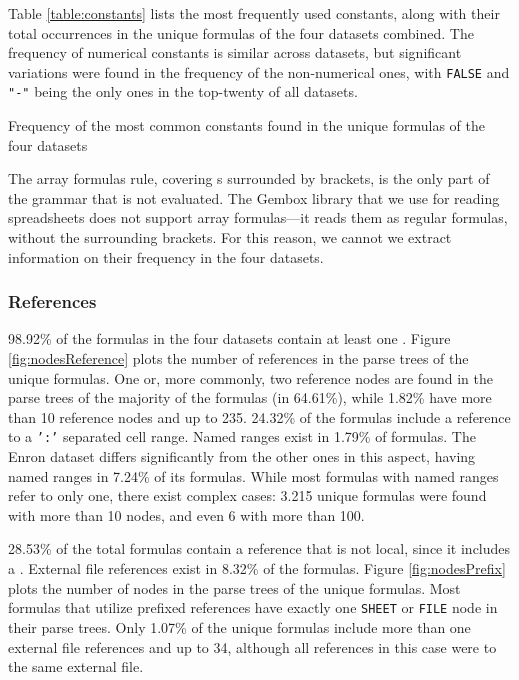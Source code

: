 \documentclass[times]{smrauth}
\begin{document}
Table \ref{table:constants} lists the most frequently used constants, along with their total occurrences in the unique formulas of the four datasets combined. The frequency of numerical constants is similar across datasets, but significant variations were found in the frequency of the non-numerical ones, with \texttt{FALSE} and \texttt{"-"} being the only ones in the top-twenty of all datasets.

\begin{table}[]
	\centering
	\caption{Frequency of the most common constants found in the unique formulas of the four datasets}
	\label{table:constants}
	
\end{table}

The array formulas rule, covering s surrounded by brackets, is the only part of the grammar that is not evaluated. The Gembox library that we use for reading spreadsheets does not support array formulas---it reads them as regular formulas, without the surrounding brackets. For this reason, we cannot we extract information on their frequency in the four datasets.

\subsubsection{References}

98.92\% of the formulas in the four datasets contain at least one . Figure \ref{fig:nodesReference} plots the number of references in the parse trees of the unique formulas. One or, more commonly, two reference nodes are found in the parse trees of the majority of the formulas (in 64.61\%), while 1.82\% have more than 10 reference nodes and up to 235. 24.32\% of the formulas include a reference to a \texttt{':'} separated cell range. Named ranges exist in 1.79\% of formulas. The Enron dataset differs significantly from the other ones in this aspect, having named ranges in 7.24\% of its formulas. While most formulas with named ranges refer to only one, there exist complex cases: 3.215  unique formulas were found with more than 10  nodes, and even 6 with more than 100.

28.53\% of the total formulas contain a reference that is not local, since it includes a . External file references exist in 8.32\% of the formulas.  Figure \ref{fig:nodesPrefix} plots the number of  nodes in the parse trees of the unique formulas. Most formulas that utilize prefixed references have exactly one \texttt{SHEET} or \texttt{FILE} node in their parse trees. Only 1.07\% of the unique formulas include more than one external file references and up to 34, although all references in this case were to the same external file.
\end{document}
